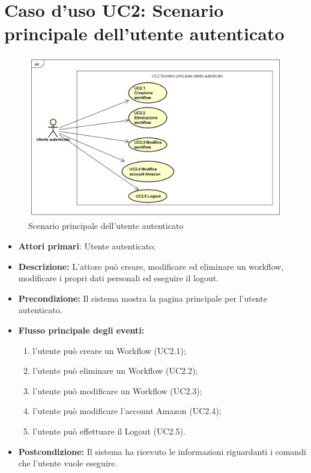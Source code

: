 		\section{Caso d'uso UC2: Scenario principale dell'utente autenticato}
		\begin{figure} [h]
			\centering
			\includegraphics[scale=0.4]{./Diagram/UC2.png}
			\caption{Scenario principale dell'utente autenticato }\label{}
		\end{figure}
		\begin{itemize}
			\item \textbf{Attori primari}: Utente autenticato;
			\item \textbf{Descrizione:} L'attore può creare, modificare ed eliminare un workflow, modificare i propri dati personali ed eseguire il logout.
			\item \textbf{Precondizione:} Il sistema mostra la pagina principale per l'utente autenticato.
			\item \textbf{Flusso principale degli eventi:}
			\begin{enumerate}
				\item l'utente può creare un Workflow (UC2.1);
				\item l'utente può eliminare un Workflow (UC2.2);
				\item l'utente può modificare un Workflow (UC2.3);
				\item l'utente può modificare l'account Amazon (UC2.4);
				\item l'utente può effettuare il Logout (UC2.5).
			\end{enumerate}
			\item \textbf{Postcondizione:} Il sistema ha ricevuto le informazioni riguardanti i comandi che l'utente vuole eseguire.
		\end{itemize}
